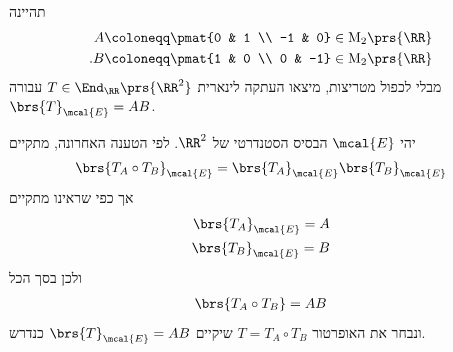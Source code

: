 \documentclass[a4paper,10pt,twoside,openany]{book}
\renewcommand{\Mat}{\mathrm{M}}
\begin{document}
\begin{exercisechap}
תהיינה
\begin{align*}
A &\coloneqq \pmat{0 & 1 \\ -1 & 0} \in \Mat_2\prs{\RR} \\
\text{.} B &\coloneqq \pmat{1 & 0 \\ 0 & -1} \in \Mat_2\prs{\RR}
\end{align*}
מבלי לכפול מטריצות, מיצאו העתקה לינארית
$T \in \End_{\RR}\prs{\RR^2}$
עבורה
$\brs{T}_{\mcal{E}} = AB$.
\end{exercisechap}

\begin{solution}
יהי
$\mcal{E}$
הבסיס הסטנדרטי של
$\RR^2$.
לפי הטענה האחרונה, מתקיים
\begin{align*}
\brs{T_A \circ T_B}_{\mcal{E}} = \brs{T_A}_{\mcal{E}} \brs{T_B}_{\mcal{E}}
\end{align*}
אך כפי שראינו מתקיים
\begin{align*}
\brs{T_A}_{\mcal{E}} = A \\ \brs{T_B}_{\mcal{E}} = B
\end{align*}
ולכן בסך הכל
\begin{align*}
\brs{T_A \circ T_B} = AB
\end{align*}
ונבחר את האופרטור
$T = T_A \circ T_B$
שיקיים
$\brs{T}_{\mcal{E}} = AB$
כנדרש.


\end{solution}
\end{document}
